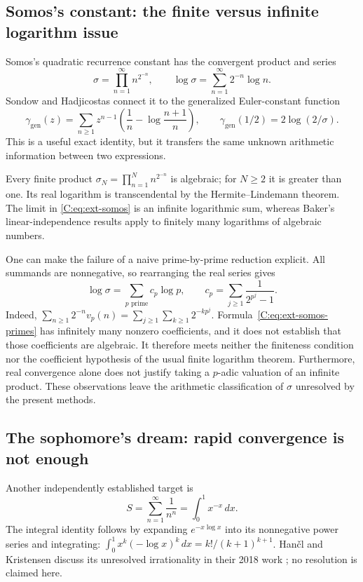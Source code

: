 \documentclass[11pt,a4paper]{article}
\theoremstyle{definition}
\theoremstyle{remark}
\numberwithin{equation}{section}
\begin{document}
\subsection{Somos's constant: the finite versus infinite logarithm issue}

Somos's quadratic recurrence constant has the convergent product and series
\begin{equation}
 \sigma=\prod_{n=1}^{\infty}n^{2^{-n}},\qquad
 \log\sigma=\sum_{n=1}^{\infty}2^{-n}\log n.
 \label{C:eq:ext-somos}
\end{equation}
Sondow and Hadjicostas \cite{R086} connect it to the
generalized Euler-constant function
\[
 \gamma_{\mathrm{gen}}(z)
 =\sum_{n\ge1}z^{n-1}
 \left(\frac1n-\log\frac{n+1}{n}\right),
 \qquad
 \gamma_{\mathrm{gen}}(1/2)=2\log(2/\sigma).
\]
This is a useful exact identity, but it transfers the same unknown
arithmetic information between two expressions.

Every finite product
$\sigma_N=\prod_{n=1}^{N}n^{2^{-n}}$ is algebraic; for $N\ge2$ it is
greater than one.  Its real logarithm is transcendental by the
Hermite--Lindemann theorem.  The limit in \eqref{C:eq:ext-somos} is an
infinite logarithmic sum, whereas Baker's linear-independence results
apply to finitely many logarithms of algebraic numbers.

One can make the failure of a naive prime-by-prime reduction explicit.
All summands are nonnegative, so rearranging the real series gives
\begin{equation}
 \log\sigma=\sum_{p\text{ prime}}c_p\log p,
 \qquad
 c_p=\sum_{j\ge1}\frac1{2^{p^j}-1}.
 \label{C:eq:ext-somos-primes}
\end{equation}
Indeed,
$\sum_{n\ge1}2^{-n}v_p(n)
=\sum_{j\ge1}\sum_{k\ge1}2^{-kp^j}$.
Formula~\eqref{C:eq:ext-somos-primes} has infinitely many nonzero
coefficients, and it does not establish that those coefficients are
algebraic.  It therefore meets neither the finiteness condition nor the
coefficient hypothesis of the usual finite logarithm theorem.  Furthermore,
real convergence alone does not justify taking a $p$-adic valuation of an
infinite product.  These observations leave the arithmetic classification
of $\sigma$ unresolved by the present methods.

\subsection{The sophomore's dream: rapid convergence is not enough}

Another independently established target is
\begin{equation}
 S=\sum_{n=1}^{\infty}\frac1{n^n}
 =\int_0^1x^{-x}\,dx.
 \label{C:eq:ext-dream}
\end{equation}
The integral identity follows by expanding
$e^{-x\log x}$ into its nonnegative power series and integrating:
$\int_0^1x^k(-\log x)^k\,dx=k!/(k+1)^{k+1}$.
Han\v{c}l and Kristensen discuss its unresolved irrationality in their
2018 work \cite{R087}; no resolution is claimed here.
\end{document}
